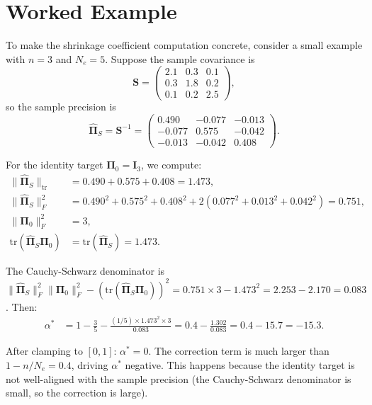 \section{Worked Example}
\label{sec:worked_example}

To make the shrinkage coefficient computation concrete, consider a small example with $n = 3$ and $N_e = 5$. Suppose the sample covariance is
\begin{equation*}
\mathbf{S} = \begin{pmatrix} 2.1 & 0.3 & 0.1 \\ 0.3 & 1.8 & 0.2 \\ 0.1 & 0.2 & 2.5 \end{pmatrix},
\end{equation*}
so the sample precision is
\begin{equation*}
\hat{\boldsymbol{\Pi}}_S = \mathbf{S}^{-1} = \begin{pmatrix} 0.490 & -0.077 & -0.013 \\ -0.077 & 0.575 & -0.042 \\ -0.013 & -0.042 & 0.408 \end{pmatrix}.
\end{equation*}

For the identity target $\boldsymbol{\Pi}_0 = \mathbf{I}_3$, we compute:
\begin{align*}
\|\hat{\boldsymbol{\Pi}}_S\|_{\text{tr}} &= 0.490 + 0.575 + 0.408 = 1.473, \\
\|\hat{\boldsymbol{\Pi}}_S\|_F^2 &= 0.490^2 + 0.575^2 + 0.408^2 + 2(0.077^2 + 0.013^2 + 0.042^2) = 0.751, \\
\|\boldsymbol{\Pi}_0\|_F^2 &= 3, \\
\text{tr}(\hat{\boldsymbol{\Pi}}_S \boldsymbol{\Pi}_0) &= \text{tr}(\hat{\boldsymbol{\Pi}}_S) = 1.473.
\end{align*}

The Cauchy-Schwarz denominator is $\|\hat{\boldsymbol{\Pi}}_S\|_F^2 \|\boldsymbol{\Pi}_0\|_F^2 - (\text{tr}(\hat{\boldsymbol{\Pi}}_S \boldsymbol{\Pi}_0))^2 = 0.751 \times 3 - 1.473^2 = 2.253 - 2.170 = 0.083$. Then:
\begin{align*}
\alpha^* &= 1 - \frac{3}{5} - \frac{(1/5) \times 1.473^2 \times 3}{0.083} = 0.4 - \frac{1.302}{0.083} = 0.4 - 15.7 = -15.3.
\end{align*}

After clamping to $[0, 1]$: $\alpha^* = 0$. The correction term is much larger than $1 - n/N_e = 0.4$, driving $\alpha^*$ negative. This happens because the identity target is not well-aligned with the sample precision (the Cauchy-Schwarz denominator is small, so the correction is large).

